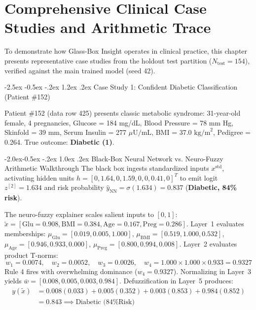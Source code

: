 \documentclass[12pt,a4paper,oneside]{report}
\makeatletter
\renewcommand\section{\@startsection {section}{1}{\z@}%
                                   {-2.5ex \@plus -0.5ex \@minus -.2ex}%
                                   {1.2ex \@plus .2ex}%
                                   {\normalfont\fontsize{13}{16}\selectfont\bfseries}}
\renewcommand\subsection{\@startsection{subsection}{2}{\z@}%
                                     {-2.0ex\@plus -0.5ex \@minus -.2ex}%
                                     {1.0ex \@plus .2ex}%
                                     {\normalfont\fontsize{12}{15}\selectfont\bfseries}}
\makeatother
\begin{document}
\chapter{Comprehensive Clinical Case Studies and Arithmetic Trace}

To demonstrate how Glass-Box Insight operates in clinical practice, this chapter presents representative case studies from the holdout test partition ($N_{\text{test}} = 154$), verified against the main trained model (seed 42).

\section{Case Study 1: Confident Diabetic Classification (Patient \#152)}

Patient \#152 (data row 425) presents classic metabolic syndrome: 31-year-old female, 4 pregnancies, Glucose = 184 mg/dL, Blood Pressure = 78 mm Hg, Skinfold = 39 mm, Serum Insulin = 277 $\mu\text{U/mL}$, BMI = 37.0 $\text{kg/m}^2$, Pedigree = 0.264. True outcome: \textbf{Diabetic (1)}.

\subsection{Black-Box Neural Network vs. Neuro-Fuzzy Arithmetic Walkthrough}
The black box ingests standardized inputs $x^{\text{std}}$, activating hidden units $h = [0, 1.64, 0, 1.59, 0, 0, 0.41, 0]^T$ to emit logit $z^{[2]} = 1.634$ and risk probability $\hat{y}_{\text{NN}} = \sigma(1.634) = \mathbf{0.837}$ (\textbf{Diabetic, 84\% risk}).

The neuro-fuzzy explainer scales salient inputs to $[0, 1]$: $\tilde{x} = [\text{Glu} = 0.908, \text{BMI} = 0.384, \text{Age} = 0.167, \text{Preg} = 0.286]$. Layer~1 evaluates memberships: $\mu_{\text{Glu}} = [0.019, 0.005, \mathbf{1.000}]$, $\mu_{\text{BMI}} = [0.519, \mathbf{1.000}, 0.532]$, $\mu_{\text{Age}} = [0.946, 0.933, 0.000]$, $\mu_{\text{Preg}} = [0.800, 0.994, 0.008]$. Layer~2 evaluates product T-norms:
\begin{equation}
    w_1 = 0.0074, \quad w_2 = 0.0052, \quad w_3 = 0.0026, \quad w_4 = 1.000 \times 1.000 \times 0.933 = \mathbf{0.9327}
\end{equation}
Rule 4 fires with overwhelming dominance ($w_4 = 0.9327$). Normalizing in Layer~3 yields $\bar{w} = [0.008, 0.005, 0.003, \mathbf{0.984}]$. Defuzzification in Layer~5 produces:
\begin{align}
    y(\tilde{x}) &= 0.008(0.033) + 0.005(0.352) + 0.003(0.853) + 0.984(0.852) \\
    &= \mathbf{0.843} \implies \text{Diabetic (84\% Risk)}
\end{align}
\end{document}
